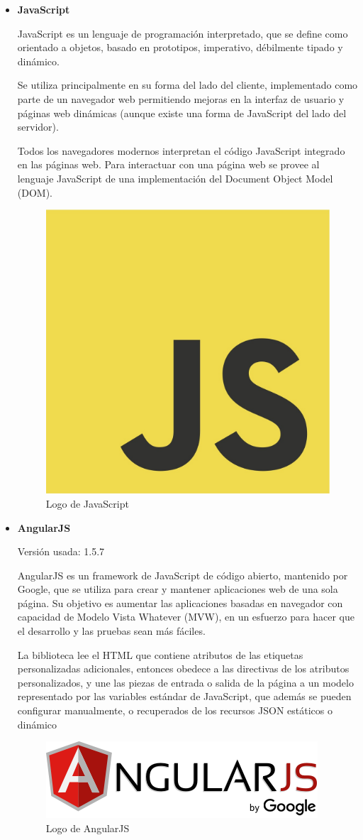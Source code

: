 \begin{itemize}
	\item \textbf{JavaScript}
		
	JavaScript \cite{js} es un lenguaje de programación interpretado, que se define como orientado a objetos, basado en prototipos, imperativo, débilmente tipado y dinámico.

	Se utiliza principalmente en su forma del lado del cliente, implementado como parte de un navegador web permitiendo mejoras en la interfaz de usuario y páginas web dinámicas (aunque existe una forma de JavaScript del lado del servidor). 

	Todos los navegadores modernos interpretan el código JavaScript integrado en las páginas web. Para interactuar con una página web se provee al lenguaje JavaScript de una implementación del Document Object Model (DOM).

	\bigskip
	\begin{figure}[h]
		\centering
		\includegraphics[width=0.3\linewidth]{../images/jslogo}
		\caption[Logo de JavasSript]{Logo de JavaScript}
		\label{fig:jslogo}
	\end{figure}
			
	\item \textbf{AngularJS}
		
	Versión usada: 1.5.7
		
	AngularJS \cite{angularjs} es un framework de JavaScript de código abierto, mantenido por Google, que se utiliza para crear y mantener aplicaciones web de una sola página. Su objetivo es aumentar las aplicaciones basadas en navegador con capacidad de Modelo Vista Whatever (MVW), en un esfuerzo para hacer que el desarrollo y las pruebas sean más fáciles.

	La biblioteca lee el HTML que contiene atributos de las etiquetas personalizadas adicionales, entonces obedece a las directivas de los atributos personalizados, y une las piezas de entrada o salida de la página a un modelo representado por las variables estándar de JavaScript, que además se pueden configurar manualmente, o recuperados de los recursos JSON estáticos o dinámico

	\bigskip
	\begin{figure}[h]
		\centering
		\includegraphics[width=0.4\linewidth]{../images/angularjslogo}
		\caption[Logo de AngularJS]{Logo de AngularJS}
		\label{fig:angularjslogo}
	\end{figure}
		

\end{itemize}
